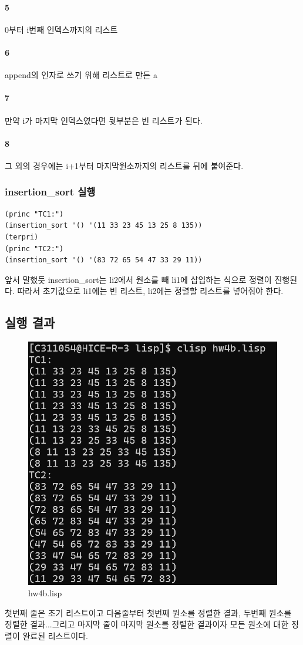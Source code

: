 \documentclass{oblivoir}
\begin{document}
\paragraph*{5}
0부터 i번째 인덱스까지의 리스트

\paragraph*{6}
append의 인자로 쓰기 위해 리스트로 만든 a

\paragraph*{7}
만약 i가 마지막 인덱스였다면 뒷부분은 빈 리스트가 된다.

\paragraph*{8}
그 외의 경우에는 i+1부터 마지막원소까지의 리스트를 뒤에 붙여준다.

\subsubsection{insertion\_sort 실행}
\begin{verbatim}
(princ "TC1:")
(insertion_sort '() '(11 33 23 45 13 25 8 135))
(terpri)
(princ "TC2:")
(insertion_sort '() '(83 72 65 54 47 33 29 11))
\end{verbatim}
앞서 말했듯 insertion\_sort는 li2에서 원소를 빼 li1에 삽입하는 식으로 정렬이 진행된다. 따라서 초기값으로 li1에는 빈 리스트, li2에는 정렬할 리스트를 넣어줘야 한다.

\subsection{실행 결과}
\begin{figure}[h]
    \centering
    \includegraphics[width=0.5\linewidth]{hw4b.png}
    \caption{hw4b.lisp}
    \label{fig:fig2}
\end{figure}
첫번째 줄은 초기 리스트이고 다음줄부터 첫번째 원소를 정렬한 결과, 두번째 원소를 정렬한 결과...그리고 마지막 줄이 마지막 원소를 정렬한 결과이자 모든 원소에 대한 정렬이 완료된 리스트이다.
\end{document}
